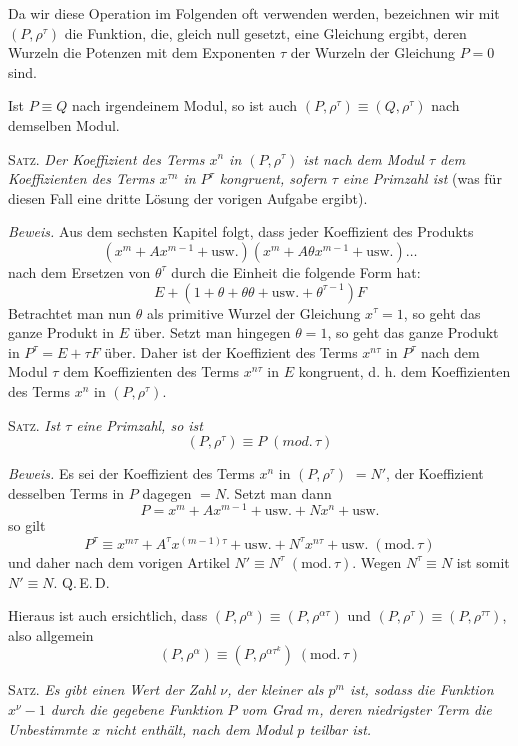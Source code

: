 Da wir diese Operation im Folgenden oft verwenden werden, bezeichnen wir mit $(P,\rho^\tau)$
die Funktion, die, gleich null gesetzt, eine Gleichung ergibt, deren Wurzeln die Potenzen mit dem Exponenten $\tau$ der Wurzeln der Gleichung $P=0$ sind.

Ist $P\equiv Q$ nach irgendeinem Modul, so ist auch $(P,\rho^\tau)\equiv(Q,\rho^\tau)$ nach demselben Modul.

\textsc{Satz.} \emph{Der Koeffizient des Terms $x^n$ in $(P,\rho^\tau)$ ist nach dem Modul $\tau$ dem Koeffizienten des Terms $x^{\tau n}$ in $P^\tau$ kongruent, sofern $\tau$ eine Primzahl ist} (was für diesen Fall eine dritte Lösung der vorigen Aufgabe ergibt).

\emph{Beweis.} Aus dem sechsten Kapitel folgt, dass jeder Koeffizient des Produkts
\[
(x^m+Ax^{m-1}+\text{usw.})(x^m+A\theta x^{m-1}+\text{usw.})\ldots
\]
nach dem Ersetzen von $\theta^\tau$ durch die Einheit die folgende Form hat:
\[
E+(1+\theta+\theta\theta+\text{usw.}+\theta^{\tau-1})F
\]
Betrachtet man nun $\theta$ als primitive Wurzel der Gleichung $x^\tau=1$, so geht das ganze Produkt in $E$ über. Setzt man hingegen $\theta=1$, so geht das ganze Produkt in $P^\tau=E+\tau F$ über. Daher ist der Koeffizient des Terms $x^{n\tau}$ in $P^\tau$ nach dem Modul $\tau$ dem Koeffizienten des Terms $x^{n\tau}$ in $E$ kongruent, d. h. dem Koeffizienten des Terms $x^n$ in $(P,\rho^\tau)$.

\textsc{Satz.} \emph{Ist $\tau$ eine Primzahl, so ist}
\[
(P,\rho^\tau)\equiv P\;(\mathit{mod.}\,\tau)
\]

\begingroup{}\relax \emph{Beweis.} Es sei der Koeffizient des Terms $x^n$ in $(P,\rho^\tau)$ $=N'$, der Koeffizient desselben Terms in $P$ dagegen $=N$. Setzt man dann
\[
P=x^m+Ax^{m-1}+\text{usw.}+Nx^n+\text{usw.}
\]
so gilt
\[
P^\tau\equiv x^{m\tau}+A^\tau x^{(m-1)\tau}+\text{usw.}+N^\tau x^{n\tau}+\text{usw.}\;(\mathrm{mod.}\,\tau)
\]
und daher nach dem vorigen Artikel $N'\equiv N^\tau\;(\mathrm{mod.}\,\tau)$. Wegen $N^\tau\equiv N$ ist somit $N'\equiv N$. Q.\,E.\,D.\par\endgroup

Hieraus ist auch ersichtlich, dass $(P,\rho^\alpha)\equiv(P,\rho^{\alpha\tau})$ und $(P,\rho^\tau)\equiv(P,\rho^{\tau\tau})$, also allgemein
\[
(P,\rho^\alpha)\equiv(P,\rho^{\alpha\tau^k})\;(\mathrm{mod.}\,\tau)
\]

\textsc{Satz.} \emph{Es gibt einen Wert der Zahl $\nu$, der kleiner als $p^m$ ist, sodass die Funktion $x^\nu-1$ durch die gegebene Funktion $P$ vom Grad $m$, deren niedrigster Term die Unbestimmte $x$ nicht enthält, nach dem Modul $p$ teilbar ist.}

